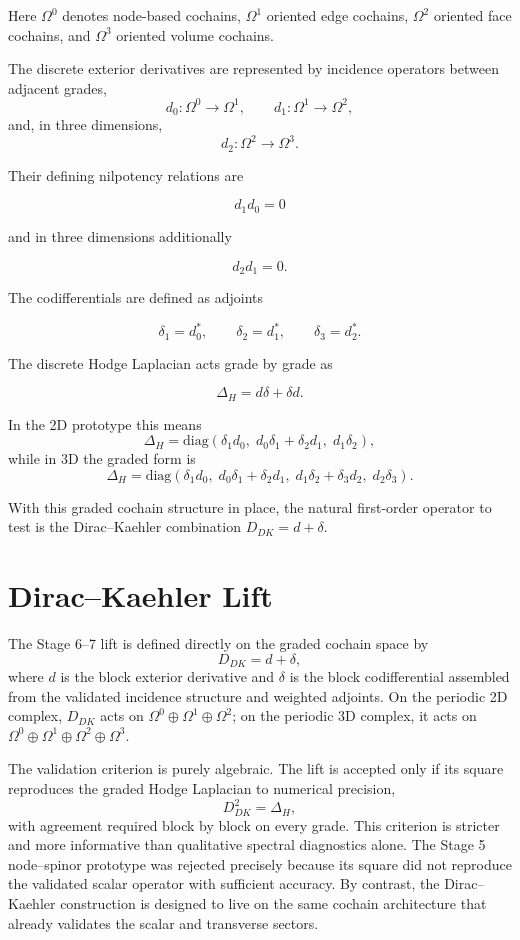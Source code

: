 \documentclass[11pt]{article}
\begin{document}
Here $\Omega^0$ denotes node-based cochains, $\Omega^1$ oriented edge cochains, $\Omega^2$ oriented face cochains, and $\Omega^3$ oriented volume cochains.

The discrete exterior derivatives are represented by incidence operators between adjacent grades,
\[
d_0 : \Omega^0 \to \Omega^1,
\qquad
d_1 : \Omega^1 \to \Omega^2,
\]
and, in three dimensions,
\[
d_2 : \Omega^2 \to \Omega^3.
\]

Their defining nilpotency relations are

\[
d_1 d_0 = 0
\]

and in three dimensions additionally

\[
d_2 d_1 = 0.
\]

The codifferentials are defined as adjoints

\[
\delta_1 = d_0^{*},\qquad
\delta_2 = d_1^{*},\qquad
\delta_3 = d_2^{*}.
\]

The discrete Hodge Laplacian acts grade by grade as

\[
\Delta_H = d\delta + \delta d .
\]

In the 2D prototype this means
\[
\Delta_H = \mathrm{diag}(\delta_1 d_0,\; d_0\delta_1 + \delta_2 d_1,\; d_1\delta_2),
\]
while in 3D the graded form is
\[
\Delta_H = \mathrm{diag}(\delta_1 d_0,\; d_0\delta_1 + \delta_2 d_1,\; d_1\delta_2 + \delta_3 d_2,\; d_2\delta_3).
\]

With this graded cochain structure in place, the natural first-order operator to test is the Dirac--Kaehler combination $D_{DK} = d + \delta$.

\section{Dirac--Kaehler Lift}
The Stage 6--7 lift is defined directly on the graded cochain space by
\[
D_{DK} = d + \delta,
\]
where $d$ is the block exterior derivative and $\delta$ is the block codifferential assembled from the validated incidence structure and weighted adjoints. On the periodic 2D complex, $D_{DK}$ acts on $\Omega^0 \oplus \Omega^1 \oplus \Omega^2$; on the periodic 3D complex, it acts on $\Omega^0 \oplus \Omega^1 \oplus \Omega^2 \oplus \Omega^3$.

The validation criterion is purely algebraic. The lift is accepted only if its square reproduces the graded Hodge Laplacian to numerical precision,
\[
D_{DK}^2 = \Delta_H,
\]
with agreement required block by block on every grade. This criterion is stricter and more informative than qualitative spectral diagnostics alone. The Stage 5 node--spinor prototype was rejected precisely because its square did not reproduce the validated scalar operator with sufficient accuracy. By contrast, the Dirac--Kaehler construction is designed to live on the same cochain architecture that already validates the scalar and transverse sectors.
\end{document}
